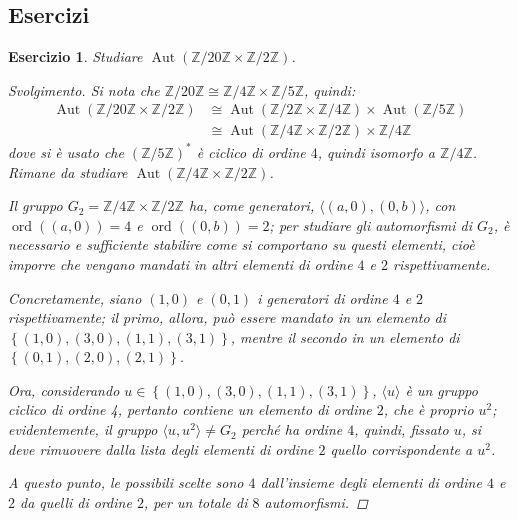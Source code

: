 \documentclass[12pt]{scrartcl}
\theoremstyle{style}
\newtheorem{esercizio}{Esercizio}[section]
\newenvironment{svolgimento}{\renewcommand\qedsymbol{$\blacksquare$}\begin{proof}[Svolgimento]}{\end{proof}}
\numberwithin{equation}{subsection}
\begin{document}
\subsection{Esercizi}
\begin{esercizio}
Studiare $\operatorname{Aut} (\mathbb{Z} / 20 \mathbb{Z} \times \mathbb{Z} / 2 \mathbb{Z})$.
\begin{svolgimento}
	Si nota che $\mathbb{Z} / 20 \mathbb{Z}\cong \mathbb{Z}/4 \mathbb{Z} \times  \mathbb{Z} / 5 \mathbb{Z}$, quindi:
	\[
		\begin{split}
			\operatorname{Aut} (\mathbb{Z}/20\mathbb{Z}\times \mathbb{Z}/2\mathbb{Z})&\cong \operatorname{Aut} (\mathbb{Z}/2\mathbb{Z} \times \mathbb{Z} / 4\mathbb{Z}) \times \operatorname{Aut} (\mathbb{Z}/5\mathbb{Z}) \\
												 &\cong\operatorname{Aut} (\mathbb{Z}/4\mathbb{Z}\times \mathbb{Z}/2\mathbb{Z}) \times \mathbb{Z}/4\mathbb{Z}
		\end{split}
	\] 
	dove si \`e usato che $(\mathbb{Z}/5\mathbb{Z})^*$ \`e ciclico di ordine $4$, quindi isomorfo a $\mathbb{Z}/4\mathbb{Z}$.
	Rimane da studiare $\operatorname{Aut} (\mathbb{Z}/4\mathbb{Z}\times \mathbb{Z}/2\mathbb{Z})$.

	Il gruppo $G_2 = \mathbb{Z}/4\mathbb{Z} \times  \mathbb{Z}/2\mathbb{Z}$ ha, come generatori, $\langle (a,0),(0,b) \rangle$, con $\operatorname{ord}((a,0)) = 4$ e $\operatorname{ord}((0,b)) =2$; per studiare gli automorfismi di $G_2$, \`e necessario e sufficiente stabilire come si comportano su questi elementi, cio\`e imporre che vengano mandati in altri elementi di ordine $4$ e $2 $ rispettivamente.

	Concretamente, siano $(1,0)$ e $(0,1)$ i generatori di ordine $4$ e $2 $ rispettivamente; il primo, allora, pu\`o essere mandato in un elemento di $\left\{ (1,0), (3,0),(1,1),(3,1) \right\} $, mentre il secondo in un elemento di $\left\{ (0,1), (2,0) , (2,1) \right\} $.

	Ora, considerando $u \in \left\{ (1,0), (3,0),(1,1),(3,1) \right\} $, $\langle u \rangle$ \`e un gruppo ciclico di ordine 4, pertanto contiene un elemento di ordine $2$, che \`e proprio $u^2$; evidentemente, il gruppo $\langle u,u^2 \rangle\neq G_2$ perch\'e ha ordine $4$, quindi, fissato $u$, si deve rimuovere dalla lista degli elementi di ordine $2$ quello corrispondente a $u^2$.

	A questo punto, le possibili scelte sono $4$ dall'insieme degli elementi di ordine $4$ e $2 $ da quelli di ordine $2$, per un totale di $8$ automorfismi.


\end{svolgimento}
\end{esercizio}
\end{document}

